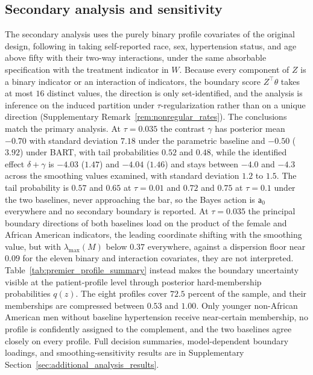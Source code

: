 \documentclass[11pt]{article}
\theoremstyle{definition}
\theoremstyle{plain}
\begin{document}
\subsection{Secondary analysis and sensitivity}
\label{sec:sensitivity_analysis_delta_p}
The secondary analysis uses the purely binary profile covariates of the original design, following \citet{Svetkey2005} in taking self-reported race, sex, hypertension status, and age above fifty with their two-way interactions, under the same absorbable specification with the treatment indicator in $W$. Because every component of $Z$ is a binary indicator or an interaction of indicators, the boundary score $Z^\top\theta$ takes at most $16$ distinct values, the direction is only set-identified, and the analysis is inference on the induced partition under $\tau$-regularization rather than on a unique direction (Supplementary Remark~\ref{rem:nonregular_rates}). The conclusions match the primary analysis. At $\tau=0.035$ the contrast $\gamma$ has posterior mean $-0.70$ with standard deviation $7.18$ under the parametric baseline and $-0.50$ ($3.92$) under BART, with tail probabilities $0.52$ and $0.48$, while the identified effect $\delta+\gamma$ is $-4.03$ ($1.47$) and $-4.04$ ($1.46$) and stays between $-4.0$ and $-4.3$ across the smoothing values examined, with standard deviation $1.2$ to $1.5$. The tail probability is $0.57$ and $0.65$ at $\tau=0.01$ and $0.72$ and $0.75$ at $\tau=0.1$ under the two baselines, never approaching the bar, so the Bayes action is $\mathsf a_0$ everywhere and no secondary boundary is reported. At $\tau=0.035$ the principal boundary directions of both baselines load on the product of the female and African American indicators, the leading coordinate shifting with the smoothing value, but with $\lambda_{\max}(M)$ below $0.37$ everywhere, against a dispersion floor near $0.09$ for the eleven binary and interaction covariates, they are not interpreted. Table~\ref{tab:premier_profile_summary} instead makes the boundary uncertainty visible at the patient-profile level through posterior hard-membership probabilities $q(z)$. The eight profiles cover $72.5$ percent of the sample, and their memberships are compressed between $0.53$ and $1.00$. Only younger non-African American men without baseline hypertension receive near-certain membership, no profile is confidently assigned to the complement, and the two baselines agree closely on every profile. Full decision summaries, model-dependent boundary loadings, and smoothing-sensitivity results are in Supplementary Section~\ref{sec:additional_analysis_results}.
\end{document}
